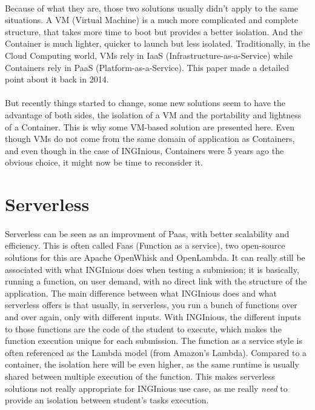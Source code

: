 \paragraph{}Because of what they are, those two solutions usually didn't apply to the same situations.  A VM (Virtual Machine) is a much more complicated and complete structure, that takes more time to boot but provides a better isolation.  And the Container is much lighter, quicker to launch but less isolated.  Traditionally, in the Cloud Computing world, VMs rely in IaaS (Infrastructure-as-a-Service) while Containers rely in PaaS (Platform-as-a-Service).  This paper \cite{dua2014virtualization} made a detailed point about it back in 2014.

\paragraph{}But recently things started to change, some new solutions seem to have the advantage of both sides, the isolation of a VM and the portability and lightness of a Container.  This is why some VM-based solution are presented here.  Even though VMs do not come from the same domain of application as Containers, and even though in the case of INGInious, Containers were 5 years ago the obvious choice, it might now be time to reconsider it.

\section{Serverless}
\paragraph{}Serverless can be seen as an improvment of Paas, with better scalability and efficiency.  This is often called Faas (Function as a service), two open-source solutions for this are Apache OpenWhisk and OpenLambda.  It can really still be associated with what INGInious does when testing a submission; it is basically, running a function, on user demand, with no direct link with the structure of the application.  The main difference between what INGInious does and what serverless offers is that usually, in serverless, you run a bunch of functions over and over again, only with different inputs.  With INGInious, the different inputs to those functions are the code of the student to execute, which makes the function execution unique for each submission.  The function as a service style is often referenced as the Lambda model (from Amazon's Lambda).  Compared to a container, the isolation here will be even higher, as the same runtime is usually shared between multiple execution of the function.\cite{hendrickson2016serverless}  This makes serverless solutions not really appropriate for INGInious use case, as me really \textit{need} to provide an isolation between student's tasks execution.

